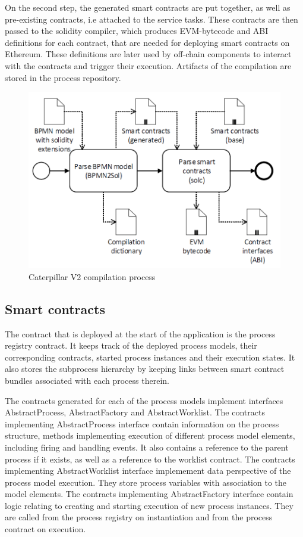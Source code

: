 On the second step, the generated smart contracts are put together, as well as pre-existing contracts, i.e attached to the service tasks. These contracts are then passed to the solidity compiler, which produces EVM-bytecode and ABI definitions for each contract, that are needed for deploying smart contracts on Ethereum. These definitions are later used by off-chain components to interact with the contracts and trigger their execution. Artifacts of the compilation are stored in the process repository.

\begin{figure}[hbt]
	\includegraphics[width=\textwidth]{gfx/caterpillar-compilation-process}
	\caption{Caterpillar V2 compilation process}
	\label{fig:caterpillar:v2:compilation}
\end{figure}

\subsection{Smart contracts}
The contract that is deployed at the start of the application is the process registry contract. It keeps track of the deployed process models, their corresponding contracts, started process instances and their execution states. It also stores the subprocess hierarchy by keeping links between smart contract bundles associated with each process therein.

The contracts generated for each of the process models implement interfaces AbstractProcess, AbstractFactory and AbstractWorklist. The contracts implementing AbstractProcess interface contain information on the process structure, methods implementing execution of different process model elements, including firing and handling events. It also contains a reference to the parent process if it exists, as well as a reference to the worklist contract. The contracts implementing AbstractWorklist interface implemement data perspective of the process model execution. They store process variables with association to the model elements.
The contracts implementing AbstractFactory interface contain logic relating to creating and starting execution of new process instances. They are called from the process registry on instantiation and from the process contract on execution.

